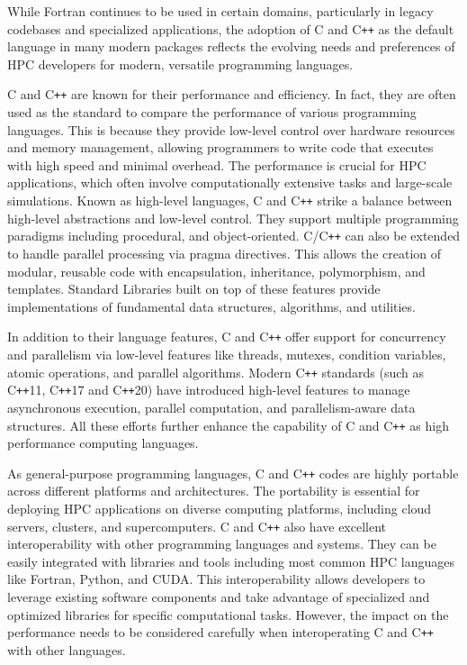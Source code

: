 While Fortran continues to be used in certain domains, particularly in legacy codebases and specialized applications, the adoption of C and C\texttt{++} as the default language in many modern packages reflects the evolving needs and preferences of HPC developers for modern, versatile programming languages.

C and C\texttt{++} are known for their performance and efficiency. 
In fact, they are often used as the standard to compare the performance of various programming languages. 
This is because they provide low-level control over hardware resources and memory management, allowing programmers to write code that executes with high speed and minimal overhead. 
The performance is crucial for HPC applications, which often involve computationally extensive tasks and large-scale simulations.
Known as high-level languages, C and C\texttt{++} strike a balance between high-level abstractions and low-level control. They support multiple programming paradigms including procedural, and object-oriented.
C/C\texttt{++} can also be extended to handle parallel processing via pragma directives.
This allows the creation of modular, reusable code with encapsulation, inheritance, polymorphism, and templates.
Standard Libraries built on top of these features provide implementations of fundamental data structures, algorithms, and utilities.

In addition to their language features, C and C\texttt{++} offer support for concurrency and parallelism via low-level features like threads, mutexes, condition variables, atomic operations, and parallel algorithms.
Modern C\texttt{++} standards (such as C\texttt{++}11, C\texttt{++}17 and C\texttt{++}20) have introduced high-level features to manage asynchronous execution, parallel computation, and parallelism-aware data structures.
All these efforts further enhance the capability of C and C\texttt{++} as high performance computing languages.

As general-purpose programming languages, C and C\texttt{++} codes are highly portable across different platforms and architectures. 
The portability is essential for deploying HPC applications on diverse computing platforms, including cloud servers, clusters, and supercomputers.
C and C\texttt{++} also have excellent interoperability with other programming languages and systems. 
They can be easily integrated with libraries and tools including most common HPC languages like Fortran, Python, and CUDA.
This interoperability allows developers to leverage existing software components and take advantage of specialized and optimized libraries for specific computational tasks.
However, the impact on the performance needs to be considered carefully when interoperating C and C\texttt{++} with other languages.

